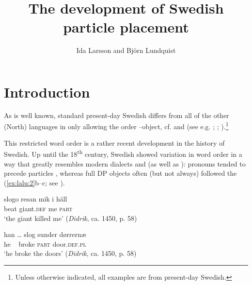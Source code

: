 \documentclass[output=paper]{langscibook}
\author{Ida Larsson\affiliation{Østfold University College, Halden} and Björn Lundquist\affiliation{The Arctic University of Norway, Tromsø}}
\title{The development of Swedish particle placement}
\begin{document}
\maketitle 

\section{Introduction}\label{sec:lalu:1}

\begin{sloppypar}
As is well known, standard present-day Swedish differs from all of the other (North)  languages in only allowing the order –object, cf.  and  (see e.g. \citealt{Svenonius1996, Svenonius2003}; \citealt{Toivonen2003}; \citealt{Lundquist2014Active}).\footnote{Unless otherwise indicated, all examples are from present-day Swedish.}
\end{sloppypar}

\ea\label{ex:lalu:1}
\z
\z


This restricted word order is a rather recent development in the history of Swedish. Up until the 18\textsuperscript{th} century, Swedish showed variation in word order in a way that greatly resembles modern  dialects and  (as well as ): pronouns tended to precede particles , whereas full DP objects often (but not always) followed the  (\ref{ex:lalu:2}b–c; see \citealt{LarssonLundquist2014}).


\ea\label{ex:lalu:2}
\ea\label{ex:lalu:2a}
\gll  slogo  resan       mik     {i häll}\\
 beat     giant.\textsc{def}   me     \textsc{part}\\
  \glt `the giant killed me’ (\textit{Didrik}, ca. 1450, p. 58)

\ex   \label{ex:lalu:2b}
\gll han …   slog  sunder   dørrernæ\\
      he  ~           broke  \textsc{part}       door\textsc{.def.pl}\\
  \glt   ‘he broke the doors’ (\textit{Didrik}, ca. 1450, p. 58)
\end{document}
